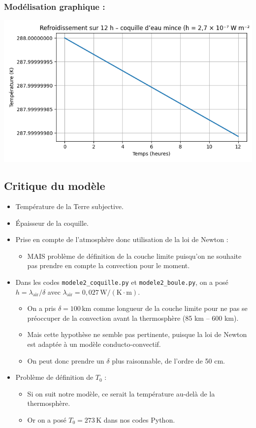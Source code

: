 \documentclass[a4paper,12pt]{article}
\begin{document}
\subsubsection*{Modélisation graphique :} 
\begin{center}
  \includegraphics[width=0.8\linewidth]{../modele2/figures/modele2_coquille.png}
\end{center}
        


\subsection*{Critique du modèle}

\begin{itemize}
    \item Température de la Terre subjective.
    \item Épaisseur de la coquille.
    \item Prise en compte de l’atmosphère donc utilisation de la loi de Newton :
    \begin{itemize}
        \item MAIS problème de définition de la couche limite puisqu’on ne souhaite pas prendre en compte la convection pour le moment.
    \end{itemize}
    \item Dans les codes \texttt{modele2\_coquille.py} et \texttt{modele2\_boule.py}, on a posé $h = \lambda_{\text{air}} / \delta$ avec $\lambda_{\text{air}} = 0{,}027 \, \mathrm{W/(K \cdot m)}$.
    \begin{itemize}
        \item On a pris $\delta = 100\, \mathrm{km}$ comme longueur de la couche limite pour ne pas se préoccuper de la convection avant la thermosphère (85 km – 600 km).
        \item Mais cette hypothèse ne semble pas pertinente, puisque la loi de Newton est adaptée à un modèle conducto-convectif.
        \item On peut donc prendre un $\delta$ plus raisonnable, de l’ordre de 50 cm.
    \end{itemize}
    \item Problème de définition de $T_0$ :
    \begin{itemize}
        \item Si on suit notre modèle, ce serait la température au-delà de la thermosphère.
        \item Or on a posé $T_0 = 273\, \mathrm{K}$ dans nos codes Python.
    \end{itemize}
\end{itemize}
\end{document}
